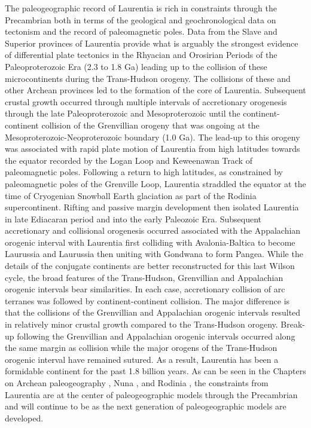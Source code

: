 \documentclass[twocolumn, switch]{article} %
\begin{document}
The paleogeographic record of Laurentia is rich in constraints through the Precambrian both in terms of the geological and geochronological data on tectonism and the record of paleomagnetic poles. Data from the Slave and Superior provinces of Laurentia provide what is arguably the strongest evidence of differential plate tectonics in the Rhyacian and Orosirian Periods of the Paleoproterozoic Era (2.3 to 1.8 Ga) leading up to the collision of these microcontinents during the Trans-Hudson orogeny. The collisions of these and other Archean provinces led to the formation of the core of Laurentia. Subsequent crustal growth occurred through multiple intervals of accretionary orogenesis through the late Paleoproterozoic and Mesoproterozoic until the continent-continent collision of the Grenvillian orogeny that was ongoing at the Mesoproterozoic-Neoproterozoic boundary (1.0 Ga). The lead-up to this orogeny was associated with rapid plate motion of Laurentia from high latitudes towards the equator recorded by the Logan Loop and Keweenawan Track of paleomagnetic poles. Following a return to high latitudes, as constrained by paleomagnetic poles of the Grenville Loop, Laurentia straddled the equator at the time of Cryogenian Snowball Earth glaciation as part of the Rodinia supercontinent. Rifting and passive margin development then isolated Laurentia in late Ediacaran period and into the early Paleozoic Era. Subsequent accretionary and collisional orogenesis occurred associated with the Appalachian orogenic interval with Laurentia first colliding with Avalonia-Baltica to become Laurussia and Laurussia then uniting with Gondwana to form Pangea. While the details of the conjugate continents are better reconstructed for this last Wilson cycle, the broad features of the Trans-Hudson, Grenvillian and Appalachian orogenic intervals bear similarities. In each case, accretionary collision of arc terranes was followed by continent-continent collision. The major difference is that the collisions of the Grenvillian and Appalachian orogenic intervals resulted in relatively minor crustal growth compared to the Trans-Hudson orogeny. Break-up following the Grenvillian and Appalachian orogenic intervals occurred along the same margin as collision while the major orogens of the Trans-Hudson orogenic interval have remained sutured. As a result, Laurentia has been a formidable continent for the past 1.8 billion years. As can be seen in the Chapters on Archean paleogeography \citep{Salminen2021b}, Nuna \citep{Elming2021a}, and Rodinia \citep{Evans2021b}, the constraints from Laurentia are at the center of paleogeographic models through the Precambrian and will continue to be as the next generation of paleogeographic models are developed.
\end{document}
